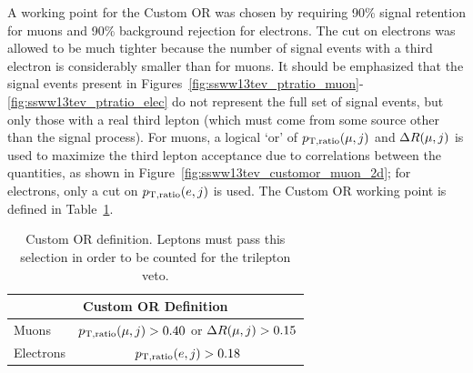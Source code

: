 A working point for the Custom OR was chosen by requiring 90\% signal retention for muons and 90\% background rejection for electrons.
The cut on electrons was allowed to be much tighter because the number of signal events with a third electron is considerably smaller than for muons.
It should be emphasized that the signal events present in Figures~\ref{fig:ssww13tev_ptratio_muon}-\ref{fig:ssww13tev_ptratio_elec} do not represent the full set of signal events, but only those with a real third lepton (which must come from some source other than the signal \ssww process).
For muons, a logical `or' of $p_{\textrm{T},\textrm{ratio}}(\mu,j)$ and $\Delta R(\mu,j)$ is used to maximize the third lepton acceptance due to correlations between the quantities, as shown in Figure~\ref{fig:ssww13tev_customor_muon_2d}; for electrons, only a cut on $p_{\textrm{T},\textrm{ratio}}(e,j)$ is used.
The Custom OR working point is defined in Table~\ref{tab:custom_or_definition}.

\begin{table}[htbp]
  \centering
  \begin{tabular}{l | c}
    \multicolumn{2}{c}{Custom OR Definition} \\
    \hline\hline
    Muons     & $p_{\textrm{T},\textrm{ratio}}(\mu,j) > 0.40$ or $\Delta R(\mu,j) > 0.15$\\
    Electrons & $p_{\textrm{T},\textrm{ratio}}(e,j) > 0.18$ \\
    \hline
  \end{tabular}
  \caption{Custom OR definition.  Leptons must pass this selection in order to be counted for the trilepton veto.}
  \label{tab:custom_or_definition}
\end{table}

